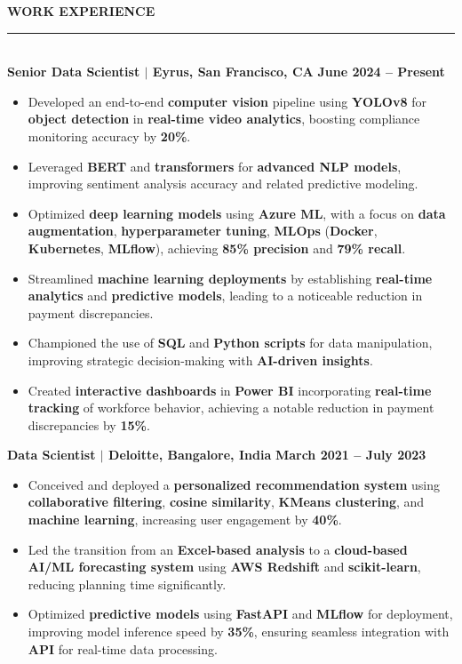 \documentclass{article}
\begin{document}
\noindent \textbf{{WORK EXPERIENCE}} \vspace{-8pt} \\
\rule{\linewidth}{0.5pt} \\
\noindent \textbf{Senior Data Scientist $\mid$ Eyrus, San Francisco, CA} \hfill \textbf{June 2024 -- Present}
\begin{itemize}[noitemsep, nolistsep, leftmargin=*]
    \item Developed an end-to-end \textbf{computer vision} pipeline using \textbf{YOLOv8} for \textbf{object detection} in \textbf{real-time video analytics}, boosting compliance monitoring accuracy by \textbf{20\%}.
    \item Leveraged \textbf{BERT} and \textbf{transformers} for \textbf{advanced NLP models}, improving sentiment analysis accuracy and related predictive modeling.
    \item Optimized \textbf{deep learning models} using \textbf{Azure ML}, with a focus on \textbf{data augmentation}, \textbf{hyperparameter tuning}, \textbf{MLOps} (\textbf{Docker}, \textbf{Kubernetes}, \textbf{MLflow}), achieving \textbf{85\% precision} and \textbf{79\% recall}.
    \item Streamlined \textbf{machine learning deployments} by establishing \textbf{real-time analytics} and \textbf{predictive models}, leading to a noticeable reduction in payment discrepancies.
    \item Championed the use of \textbf{SQL} and \textbf{Python scripts} for data manipulation, improving strategic decision-making with \textbf{AI-driven insights}.
    \item Created \textbf{interactive dashboards} in \textbf{Power BI} incorporating \textbf{real-time tracking} of workforce behavior, achieving a notable reduction in payment discrepancies by \textbf{15\%}.
\end{itemize}

\vspace{1mm}
\noindent \textbf{Data Scientist $\mid$ Deloitte, Bangalore, India} \hfill \textbf{March 2021 -- July 2023}
\begin{itemize}[noitemsep, nolistsep, leftmargin=*]
    \item Conceived and deployed a \textbf{personalized recommendation system} using \textbf{collaborative filtering}, \textbf{cosine similarity}, \textbf{KMeans clustering}, and \textbf{machine learning}, increasing user engagement by \textbf{40\%}.
    \item Led the transition from an \textbf{Excel-based analysis} to a \textbf{cloud-based AI/ML forecasting system} using \textbf{AWS Redshift} and \textbf{scikit-learn}, reducing planning time significantly.
    \item Optimized \textbf{predictive models} using \textbf{FastAPI} and \textbf{MLflow} for deployment, improving model inference speed by \textbf{35\%}, ensuring seamless integration with \textbf{API} for real-time data processing.
\end{itemize}
\end{document}
